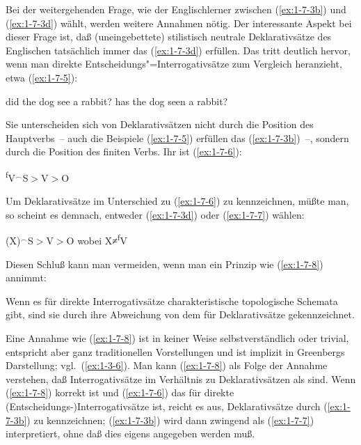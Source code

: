 \documentclass[output=paper]{langsci/langscibook}
\begin{document}
Bei der weitergehenden Frage, wie der Englischlerner zwischen (\ref{ex:1-7-3b}) und (\ref{ex:1-7-3d})
wählt, werden weitere Annahmen nötig. Der interessante Aspekt bei dieser Frage ist,
daß (uneingebettete) stilistisch neutrale Deklarativsätze des Englischen tatsächlich
immer das  (\ref{ex:1-7-3d}) erfüllen. Das tritt deutlich hervor, wenn man direkte Entscheidungs"=Interrogativsätze zum Vergleich heranzieht, etwa (\ref{ex:1-7-5}):
\begin{exe}
\ex\label{ex:1-7-5}
\begin{xlist}
\ex\label{ex:1-7-5a} did the dog see a rabbit?
\ex\label{ex:1-7-5b} has the dog seen a rabbit?
\end{xlist}
\end{exe}
Sie unterscheiden sich von Deklarativsätzen nicht durch die Position des Haupt\-verbs~-- auch die Beispiele (\ref{ex:1-7-5}) erfüllen das  (\ref{ex:1-7-3b})~–, sondern durch die Position des finiten Verbs. Ihr  ist (\ref{ex:1-7-6}):
\begin{exe}
\ex\label{ex:1-7-6}
\textsuperscript{f}V$^{\smallfrown}$S$>$V$>$O
\end{exe}
Um Deklarativsätze im Unterschied zu (\ref{ex:1-7-6}) zu kennzeichnen, müßte man, so scheint
es demnach, entweder (\ref{ex:1-7-3d}) oder (\ref{ex:1-7-7}) wählen:
\begin{exe}
\ex\label{ex:1-7-7}
(X)$^{\smallfrown}$S$>$V$>$O \quad wobei X≠\textsuperscript{f}V
\end{exe}
Diesen Schluß kann man vermeiden, wenn man ein Prinzip wie (\ref{ex:1-7-8}) annimmt:
\begin{exe}
\ex\label{ex:1-7-8}
Wenn es für direkte Interrogativsätze charakteristische topologische Schemata gibt, sind sie durch ihre Abweichung von dem  für Deklarativsätze gekennzeichnet.
\end{exe}
Eine Annahme wie (\ref{ex:1-7-8}) ist in keiner Weise
selbstverständlich oder trivial, entspricht aber ganz traditionellen
Vorstellungen und ist implizit in Greenbergs Darstellung;
vgl.\ (\ref{ex:1-3-6}). Man kann (\ref{ex:1-7-8}) als Folge der Annahme
verstehen, daß Interrogativsätze im Verhältnis zu Deklarativsätzen als
  sind. Wenn (\ref{ex:1-7-8}) korrekt ist und
(\ref{ex:1-7-6}) das  für direkte
(Entscheidungs-)Interro\-gativsätze ist, reicht es aus,
Deklarativsätze durch (\ref{ex:1-7-3b}) zu kennzeichnen;
(\ref{ex:1-7-3b}) wird dann zwingend als (\ref{ex:1-7-7})
interpretiert, ohne daß dies eigens angegeben werden muß.
\end{document}
